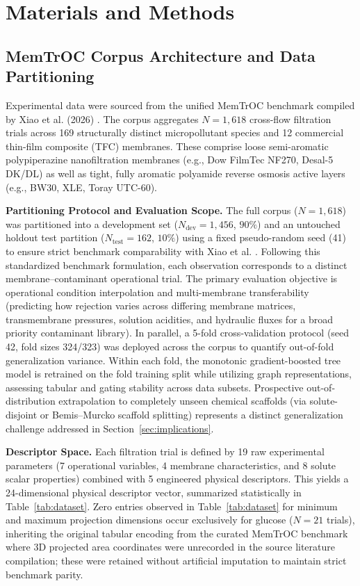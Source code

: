 \documentclass[11pt]{article}
\begin{document}
\section{Materials and Methods}
\label{sec:methods}

\subsection{MemTrOC Corpus Architecture and Data Partitioning}
\label{subsec:dataset}

Experimental data were sourced from the unified MemTrOC benchmark compiled by Xiao et al. (2026) \cite{xiao2026}. The corpus aggregates $N = 1{,}618$ cross-flow filtration trials across 169 structurally distinct micropollutant species and 12 commercial thin-film composite (TFC) membranes. These comprise loose semi-aromatic polypiperazine nanofiltration membranes (e.g., Dow FilmTec NF270, Desal-5 DK/DL) as well as tight, fully aromatic polyamide reverse osmosis active layers (e.g., BW30, XLE, Toray UTC-60).

\textbf{Partitioning Protocol and Evaluation Scope.} The full corpus ($N = 1{,}618$) was partitioned into a development set ($N_{\mathrm{dev}} = 1{,}456$, $90\%$) and an untouched holdout test partition ($N_{\mathrm{test}} = 162$, $10\%$) using a fixed pseudo-random seed (41) to ensure strict benchmark comparability with Xiao et al. \cite{xiao2026}. Following this standardized benchmark formulation, each observation corresponds to a distinct membrane--contaminant operational trial. The primary evaluation objective is operational condition interpolation and multi-membrane transferability (predicting how rejection varies across differing membrane matrices, transmembrane pressures, solution acidities, and hydraulic fluxes for a broad priority contaminant library). In parallel, a 5-fold cross-validation protocol (seed 42, fold sizes 324/323) was deployed across the corpus to quantify out-of-fold generalization variance. Within each fold, the monotonic gradient-boosted tree model is retrained on the fold training split while utilizing graph representations, assessing tabular and gating stability across data subsets. Prospective out-of-distribution extrapolation to completely unseen chemical scaffolds (via solute-disjoint or Bemis--Murcko scaffold splitting) represents a distinct generalization challenge addressed in Section~\ref{sec:implications}.

\textbf{Descriptor Space.} Each filtration trial is defined by 19 raw experimental parameters (7 operational variables, 4 membrane characteristics, and 8 solute scalar properties) combined with 5 engineered physical descriptors. This yields a 24-dimensional physical descriptor vector, summarized statistically in Table~\ref{tab:dataset}. Zero entries observed in Table~\ref{tab:dataset} for minimum and maximum projection dimensions occur exclusively for glucose ($N = 21$ trials), inheriting the original tabular encoding from the curated MemTrOC benchmark \cite{xiao2026} where 3D projected area coordinates were unrecorded in the source literature compilation; these were retained without artificial imputation to maintain strict benchmark parity.
\end{document}
